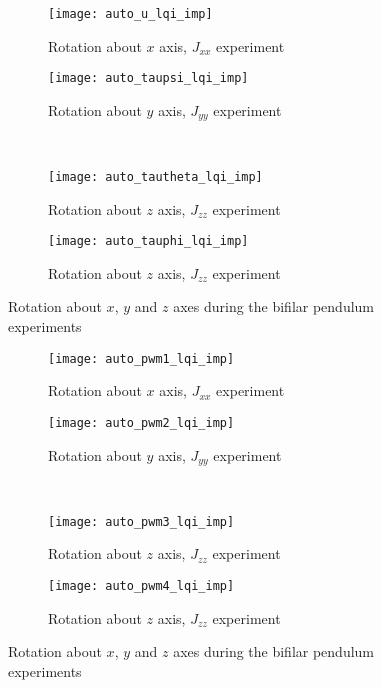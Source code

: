 \begin{appendices}
\begin{figure}[H]
\begin{subfigure}{.5\linewidth}
\centering
\texttt{[image: auto\_u\_lqi\_imp]}
\caption{Rotation about $x$ axis, $J_{xx}$ experiment}
\label{fig:auto_u_lqi_imp}
\end{subfigure}%
\begin{subfigure}{.5\linewidth}
\centering
\texttt{[image: auto\_taupsi\_lqi\_imp]}
\caption{Rotation about $y$ axis, $J_{yy}$ experiment}
\label{fig:auto_taupsi_lqi_imp}
\end{subfigure}\\[1ex]
\begin{subfigure}{0.5\linewidth}
\centering
\texttt{[image: auto\_tautheta\_lqi\_imp]}
\caption{Rotation about $z$ axis, $J_{zz}$ experiment}
\label{fig:auto_tautheta_lqi_imp}
\end{subfigure}
\begin{subfigure}{0.5\linewidth}
\centering
\texttt{[image: auto\_tauphi\_lqi\_imp]}
\caption{Rotation about $z$ axis, $J_{zz}$ experiment}
\label{fig:auto_tauphi_h_lqi}
\end{subfigure}
\caption{Rotation about $x$, $y$ and $z$ axes during the bifilar pendulum experiments}
\label{fig:auto_control_lqi}
\end{figure}

\begin{figure}[H]
\begin{subfigure}{.5\linewidth}
\centering
\texttt{[image: auto\_pwm1\_lqi\_imp]}
\caption{Rotation about $x$ axis, $J_{xx}$ experiment}
\label{fig:auto_pwm_lqi_imp}
\end{subfigure}%
\begin{subfigure}{.5\linewidth}
\centering
\texttt{[image: auto\_pwm2\_lqi\_imp]}
\caption{Rotation about $y$ axis, $J_{yy}$ experiment}
\label{fig:auto_pwm2_lqi_imp}
\end{subfigure}\\[1ex]
\begin{subfigure}{0.5\linewidth}
\centering
\texttt{[image: auto\_pwm3\_lqi\_imp]}
\caption{Rotation about $z$ axis, $J_{zz}$ experiment}
\label{fig:auto_pwm3_lqi_imp}
\end{subfigure}
\begin{subfigure}{0.5\linewidth}
\centering
\texttt{[image: auto\_pwm4\_lqi\_imp]}
\caption{Rotation about $z$ axis, $J_{zz}$ experiment}
\label{fig:auto_pwm4_lqi_imp}
\end{subfigure}
\caption{Rotation about $x$, $y$ and $z$ axes during the bifilar pendulum experiments}
\label{fig:auto_pwm_lqi}
\end{figure}




\end{appendices}
